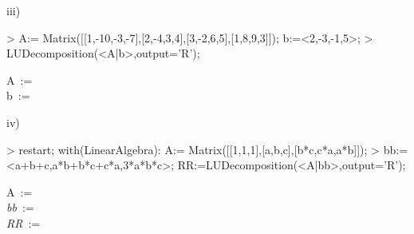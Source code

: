 \begin{enumerate}
iii)
\begin{MapleInput}
> A:= Matrix([[1,-10,-3,-7],[2,-4,3,4],[3,-2,6,5],[1,8,9,3]]); b:=<2,-3,-1,5>;
> LUDecomposition(<A|b>,output='R');
\end{MapleInput}
\begin{MapleOutputGather}
A\, := \,   \notag \\
b\, := \, \left[ \begin {array}{c} 2\\  -3\\  -1\\  5\end {array} \right]   \notag \\
  \notag
\end{MapleOutputGather}

iv)
\begin{MapleInput}
> restart; with(LinearAlgebra): A:= Matrix([[1,1,1],[a,b,c],[b*c,c*a,a*b]]);
> bb:=<a+b+c,a*b+b*c+c*a,3*a*b*c>; RR:=LUDecomposition(<A|bb>,output='R');
\end{MapleInput}
\begin{MapleOutputGather}
A\, := \,    \notag \\
{\it bb}\, := \,    \notag \\
{\it RR}\, := \,    \notag
\end{MapleOutputGather}


\end{enumerate}
